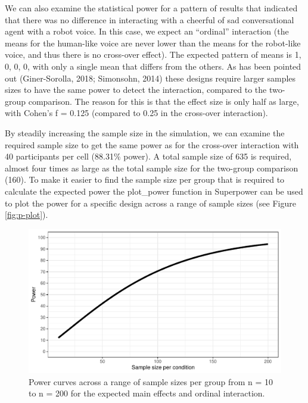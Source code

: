 \documentclass[
  ,jou,floatsintext]{apa6}
\begin{document}
We can also examine the statistical power for a pattern of results that indicated that there was no difference in interacting with a cheerful of sad conversational agent with a robot voice.
In this case, we expect an \enquote{ordinal} interaction (the means for the human-like voice are never lower than the means for the robot-like voice, and thus there is no cross-over effect).
The expected pattern of means is 1, 0, 0, 0, with only a single mean that differs from the others.
As has been pointed out (Giner-Sorolla, 2018; Simonsohn, 2014) these designs require larger samples sizes to have the same power to detect the interaction, compared to the two-group comparison.
The reason for this is that the effect size is only half as large, with Cohen's f = 0.125 (compared to 0.25 in the cross-over interaction).

By steadily increasing the sample size in the simulation, we can examine the required sample size to get the same power as for the cross-over interaction with 40 participants per cell (88.31\% power). A total sample size of 635 is required, almost four times as large as the total sample size for the two-group comparison (160). To make it easier to find the sample size per group that is required to calculate the expected power the plot\_power function in Superpower can be used to plot the power for a specific design across a range of sample sizes (see Figure \ref{fig:p-plot}).

\begin{figure}
\centering
\includegraphics{0.1_Simulation_Based_Power_Analysis_For_Factorial_ANOVA_Designs_files/figure-latex/power-plot-1.pdf}
\caption{\label{fig:power-plot}Power curves across a range of sample sizes per group from n = 10 to n = 200 for the expected main effects and ordinal interaction.}
\end{figure}
\end{document}
